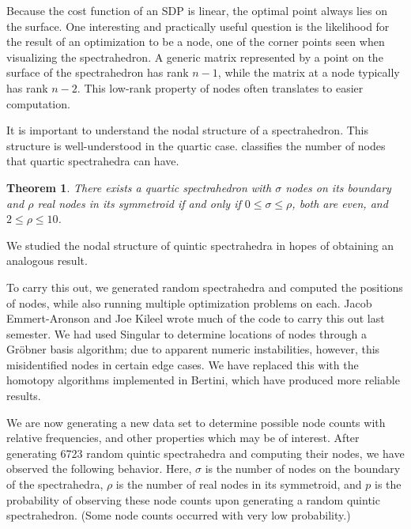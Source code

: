 \documentclass[12pt]{amsart}
\theoremstyle{plain}
\newtheorem{theorem}{Theorem}
\theoremstyle{definition}
\begin{document}
Because the cost function of an SDP is linear, the optimal point
always lies on the surface.  One interesting and practically useful
question is the likelihood for the result of an optimization to be a
node, one of the corner points seen when visualizing the
spectrahedron.  A generic matrix represented by a point on the surface
of the spectrahedron has rank $n-1$, while the matrix at a node
typically has rank $n-2$.  This low-rank property of nodes often
translates to easier computation.

It is important to understand the nodal structure of a spectrahedron. 
This structure is well-understood in the quartic case. 
\cite{OKSV} classifies the number of nodes that quartic spectrahedra can have. 
\begin{theorem}\label{quartic}
	There exists a quartic spectrahedron with $\sigma$ nodes on its boundary and
	$\rho$ real nodes in its symmetroid if and only if $0 \le \sigma \le \rho$,
	both are even, and $2 \le \rho \le 10$.
\end{theorem} 
We studied the nodal structure of quintic spectrahedra in hopes of obtaining an
analogous result.

To carry this out, we generated random spectrahedra and computed
the positions of nodes, while also running multiple optimization
problems on each.  Jacob Emmert-Aronson and Joe Kileel wrote much of
the code to carry this out last semester.  
We had used Singular
to determine locations of nodes through a Gr\"obner basis algorithm;
due to apparent numeric instabilities, however, this misidentified
nodes in certain edge cases.  We have replaced this with the
homotopy algorithms implemented in Bertini, which have produced more
reliable results.  

We are now generating a new data set to determine possible node counts with
relative frequencies, and other properties which may be of interest.  After
generating 6723 random quintic spectrahedra and computing their nodes, we have
observed the following behavior. Here, $\sigma$ is the number of nodes on the
boundary of the spectrahedra, $\rho$ is the number of real nodes in its
symmetroid, and $p$ is the probability of observing these node counts upon
generating a random quintic spectrahedron. (Some node counts occurred with
very low probability.)
\end{document}
